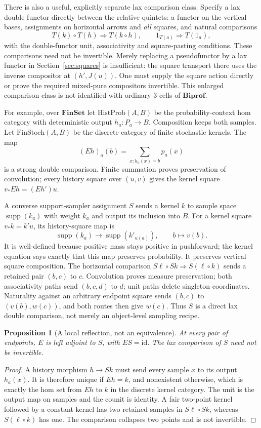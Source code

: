 \documentclass[11pt]{article}
\newtheorem{proposition}[theorem]{Proposition}
\theoremstyle{definition}
\newcommand{\Biprof}{\mathbf{Biprof}}
\newcommand{\id}{\mathrm{id}}
\begin{document}
There is also a useful, explicitly separate lax comparison class. Specify a
lax double functor directly between the relative quintets: a functor on the
vertical bases, assignments on horizontal arrows and \emph{all} squares,
and natural comparisons
\[
 T(k)\circ T(h)\Longrightarrow T(k\circ h),\qquad
 1_{T(a)}\Longrightarrow T(1_a),
\]
with the double-functor unit, associativity and square-pasting conditions.
These comparisons need not be invertible. Merely replacing a pseudofunctor
by a lax functor in Section~\ref{sec:squares} is insufficient: the square
transport there uses the inverse compositor at $(h',J(u))$. One must
supply the square action directly or prove the required mixed-pure
compositors invertible. This enlarged comparison class is not identified
with ordinary 3-cells of $\Biprof$.

For example, over $\mathbf{FinSet}$ let $\mathrm{HistProb}(A,B)$ be the
probability-context hom category with deterministic output $h_a:P_a\to B$.
Composition keeps both samples. Let $\mathrm{FinStoch}(A,B)$ be the
discrete category of finite stochastic kernels. The map
\begin{equation}\label{eq:historyE}
 (Eh)_a(b)=\sum_{x:h_a(x)=b}p_a(x)
\end{equation}
is a strong double comparison. Finite summation proves preservation of
convolution; every history square over $(u,v)$ gives the kernel square
$v_*Eh=(Eh')u$.

A converse support-sampler assignment $S$ sends a kernel $k$ to sample space
$\operatorname{supp}(k_a)$ with weight $k_a$ and output its inclusion into
$B$. For a kernel square $v_*k=k'u$, its history-square map is
\[
 \operatorname{supp}(k_a)\longrightarrow
 \operatorname{supp}(k'_{u(a)}),\qquad b\longmapsto v(b).
\]
It is well-defined because positive mass stays positive in pushforward;
the kernel equation says exactly that this map preserves probability.
It preserves vertical square composition. The horizontal comparison
$S\ell\circ Sk\Rightarrow S(\ell\circ k)$ sends a retained pair $(b,c)$
to $c$. Convolution proves measure preservation; both associativity paths
send $(b,c,d)$ to $d$; unit paths delete singleton coordinates. Naturality
against an arbitrary endpoint square sends $(b,c)$ to $(v(b),w(c))$, and
both routes then give $w(c)$. Thus $S$ is a direct lax double comparison,
not merely an object-level sampling recipe.

\begin{proposition}[A local reflection, not an equivalence]
At every pair of endpoints, $E$ is left adjoint to $S$, with $ES=\id$.
The lax comparison of $S$ need not be invertible.
\end{proposition}
\begin{proof}
A history morphism $h\to Sk$ must send every sample $x$ to its output
$h_a(x)$. It is therefore unique if $Eh=k$, and nonexistent otherwise,
which is exactly the hom set from $Eh$ to $k$ in the discrete kernel
category. The unit is the output map on samples and the counit is identity.
A fair two-point kernel followed by a constant kernel has two retained
samples in $S\ell\circ Sk$, whereas $S(\ell\circ k)$ has one. The
comparison collapses two points and is not invertible.
\end{proof}
\end{document}
